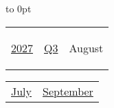 \vbox to 0pt{}


\pagebreak
{\noindent\Large\renewcommand{\arraystretch}{\myNumArrayStretch}\begin{tabular}{|l|l|l}
\hyperlink{2027}{2027} & \hyperlink{Q3}{Q3} & \hypertarget{August}{August}
\end{tabular}\hfill%
\begin{tabular}{r|r@{}}
\hyperlink{July}{July} & \hyperlink{September}{September}
\end{tabular}}
\myLineThick\medskip

{%

\setlength{\tabcolsep}{\myLenTabColSep}%
%
\begin{tabularx}{\linewidth}{|l!{\vrule width \myLenLineThicknessThick}*{7}{@{}X@{}|}}
  

\end{tabularx}}
